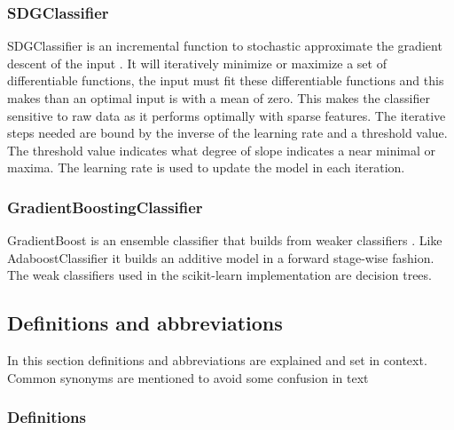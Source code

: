 \documentclass[a4paper,10pt]{article}
\begin{document}
\subsubsection{SDGClassifier}
SDGClassifier is an incremental function to stochastic approximate the gradient descent of the input \cite{SGDClass}. It will iteratively minimize or maximize a set of differentiable functions, the input must fit these differentiable functions and this makes than an optimal input is with a mean of zero.  This makes the classifier sensitive to raw data as it performs optimally with sparse features. The iterative steps needed are bound by the inverse of the learning rate and a threshold value. The threshold value indicates what degree of slope indicates a near minimal or maxima. The learning rate is used to update the model in each iteration.

\subsubsection{GradientBoostingClassifier}
GradientBoost is an ensemble classifier that builds from weaker classifiers \cite{GradientBoost}. Like AdaboostClassifier it builds an additive model in a forward stage-wise fashion.  The weak classifiers used in the scikit-learn implementation are decision trees.  %



\subsection{Definitions and abbreviations}
In this section definitions and abbreviations are explained and set in context. Common synonyms are mentioned to avoid some confusion in text
\subsubsection{Definitions}
\end{document}
